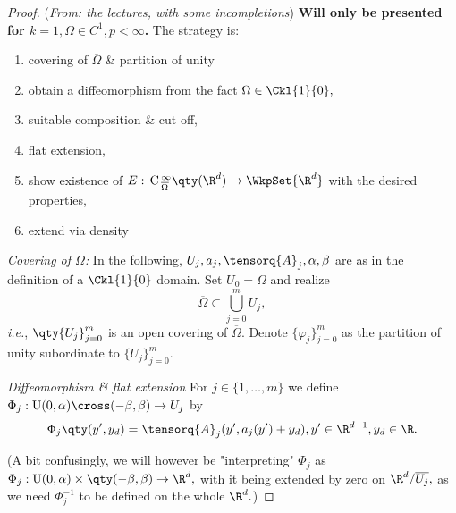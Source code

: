\begin{proof}(\textit{From: the lectures, with some incompletions})
	\textbf{Will only be presented for $k=1, \Omega \in C^1, p < \infty$.} The strategy is:
	\begin{enumerate}
		\item covering of $\overline{\Omega}$ \& partition of unity
		\item obtain a diffeomorphism from the fact $\Omega \in \Ckl{1}{0},$
		\item suitable composition \& cut off,
		\item flat extension,
		\item show existence of $E: \, \text{C} \,^{\infty}_{\overline{\Omega}}\qty(\R^{d})\to \WkpSet{\R^{d}}$ with the desired properties,
		\item extend via density
	\end{enumerate}

	\textit{Covering of $\Omega$:}
	In the following,  $U_j,a_j, \tensorq{A}_j, \alpha, \beta$ are as in the definition of a $\Ckl{1}{0}$ domain. Set $U_0 = \Omega$ and realize
	\[
		\overline{\Omega} \subset \bigcup_{j=0}^m U_j,
	\]
	\textit{i.e.}, $\qty{U_j}_{j=0}^m$ is an open covering of $\overline{\Omega}$. Denote $\{\varphi_j \}_{j=0}^m$ as the partition of unity subordinate to $\{U_j\}_{j=0}^m.$


	\textit{Diffeomorphism \& flat extension}
	For $j \in \{1, \dots, m\}$ we define $\Phi_j : \text{U}(0,\alpha) \cross (-\beta,\beta) \to U_j$ by
	\[
		\Phi_j\qty(y',y_d) = \tensorq{A}_j (y', a_j(y') + y_d), y' \in \R^{d-1}, y_d \in \R.
	\]

	(A bit confusingly, we will however be "interpreting" $\Phi_j$ as $\Phi_j : \text{U}(0,\alpha) \times \qty(-\beta, \beta) \to \R^{d},$ with it being extended by zero on $\R^{d}/ \overline{U_j},$ as we need $\Phi_j^{-1}$ to be defined on the whole $\R^{d}.$)


\end{proof}
